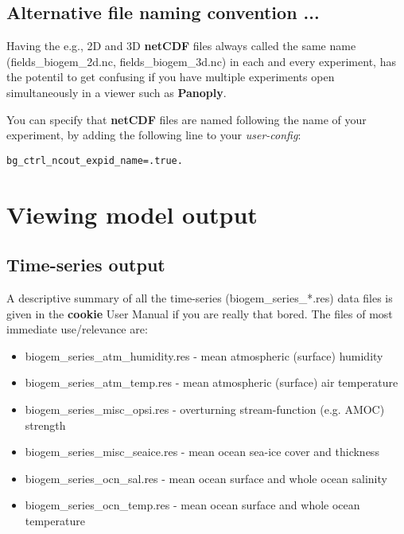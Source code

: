 \subsection*{Alternative file naming convention ...}

Having the e.g., 2D and 3D \textbf{netCDF} files always called the same name (\textsf{\footnotesize fields\_biogem\_2d.nc}, \textsf{\footnotesize fields\_biogem\_3d.nc}) in each and every experiment, has the potentil to get confusing if you have multiple experiments open simultaneously in a viewer such as \textbf{Panoply}.

You can specify that \textbf{netCDF} files are named following the name of your experiment, by adding the following line to your \textit{user-config}:

\vspace{-2pt}\begin{verbatim}
bg_ctrl_ncout_expid_name=.true.
\end{verbatim}

\newpage

\section{Viewing model output}


\subsection{Time-series output}

A descriptive summary of all the time-series (\textsf{\footnotesize biogem\_series\_*.res}) data files is given in the \textbf{cookie} User Manual if you are really that bored. The files of most immediate use/relevance are:

\vspace{1mm}
\begin{itemize}[noitemsep]
\setlength{\itemindent}{.2in}
\item \textsf{\footnotesize biogem\_series\_atm\_humidity.res}  - mean atmospheric (surface) humidity
\item \textsf{\footnotesize biogem\_series\_atm\_temp.res}      - mean atmospheric (surface) air temperature
\item \textsf{\footnotesize biogem\_series\_misc\_opsi.res}     - overturning stream-function (e.g. AMOC) strength
\item \textsf{\footnotesize biogem\_series\_misc\_seaice.res}   - mean ocean sea-ice cover and thickness
\item \textsf{\footnotesize biogem\_series\_ocn\_sal.res}       - mean ocean surface and whole ocean salinity
\item \textsf{\footnotesize biogem\_series\_ocn\_temp.res}      - mean ocean surface and whole ocean temperature
\end{itemize}

